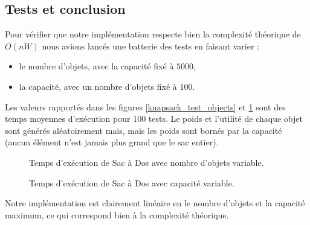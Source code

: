 \subsection{Tests et conclusion}

Pour vérifier que notre implémentation respecte bien la complexité théorique de $O(nW)$ nous avions lancés une batterie des tests en faisant varier : 

\begin{itemize}
\item le nombre d'objets, avec la capacité fixé à $5000$,
\item la capacité, avec un nombre d'objets fixé à $100$.
\end{itemize}

Les valeurs rapportés dans les figures \ref{knapsack_test_objects} et \ref{knapsack_test_capacity} sont des temps moyennes d'exécution pour $100$ tests. Le poids et l'utilité de chaque objet sont générés aléatoirement mais, mais les poids sont bornés par la capacité (aucun élément n'est jamais plus grand que le sac entier).

\begin{figure}[ht]
\begin{minipage}[b]{0.5\linewidth}
\centering
{}
\caption{Temps d'exécution de Sac à Dos avec nombre d'objets variable.}
\label{knapsack_test_objects}
\end{minipage}
\hspace{0.5cm}
\begin{minipage}[b]{0.5\linewidth}
\centering
{}
\caption{Temps d'exécution de Sac à Dos avec capacité variable.}
\label{knapsack_test_capacity}
\end{minipage}
\end{figure}

Notre implémentation est clairement linéaire en le nombre d'objets et la capacité maximum, ce qui correspond bien à la complexité théorique.
